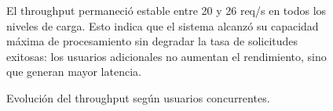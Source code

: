 \begin{figure}[H]
    \centering
    \begin{minipage}{0.55\textwidth}
        \centering
    \end{minipage}
    \hfill
    \begin{minipage}{0.40\textwidth}
        \small
        El throughput permaneció estable entre 20 y 26 req/s en todos los niveles de carga. Esto indica que el sistema alcanzó su capacidad máxima de procesamiento sin degradar la tasa de solicitudes exitosas: los usuarios adicionales no aumentan el rendimiento, sino que generan mayor latencia.
\end{minipage}
    \caption{Evolución del throughput según usuarios concurrentes.}
    \label{fig:creacion-throughput}
\end{figure}






